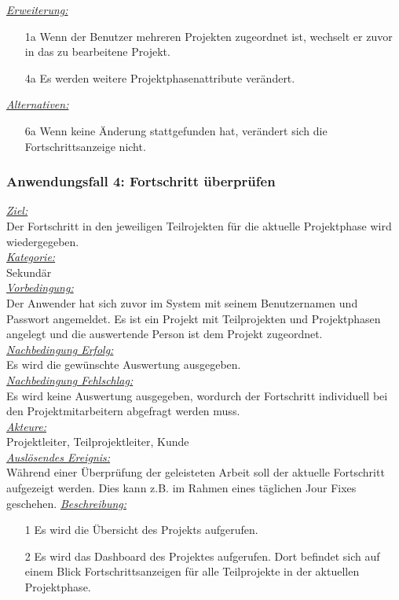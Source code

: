 \underline{\emph{Erweiterung:}} 
\begin{itemize}
    \item [1a] Wenn der Benutzer mehreren Projekten zugeordnet ist, wechselt er zuvor in das zu bearbeitene Projekt. 
    \item [4a] Es werden weitere Projektphasenattribute verändert.
\end{itemize}
\underline{\emph{Alternativen:}}
\begin{itemize}
    \item [6a] Wenn keine Änderung stattgefunden hat, verändert sich die Fortschrittsanzeige nicht.
\end{itemize}

\subsubsection{Anwendungsfall 4: Fortschritt überprüfen}
\underline{\emph{Ziel:}}\\
Der Fortschritt in den jeweiligen Teilrojekten für die aktuelle Projektphase wird wiedergegeben.\\
\underline{\emph{Kategorie:}} \\
Sekundär\\
\underline{\emph{Vorbedingung:}} \\
Der Anwender hat sich zuvor im System mit seinem Benutzernamen und Passwort angemeldet. Es ist ein Projekt mit Teilprojekten und Projektphasen angelegt und die auswertende Person ist dem Projekt zugeordnet.\\
\underline{\emph{Nachbedingung Erfolg:}} \\
Es wird die gewünschte Auswertung ausgegeben.\\
\underline{\emph{Nachbedingung Fehlschlag:}} \\
Es wird keine Auswertung ausgegeben, wordurch der Fortschritt individuell bei den Projektmitarbeitern abgefragt werden muss.\\
\underline{\emph{Akteure:}} \\
Projektleiter, Teilprojektleiter, Kunde\\
\underline{\emph{Auslösendes Ereignis:}} \\
Während einer Überprüfung der geleisteten Arbeit soll der aktuelle Fortschritt aufgezeigt werden. Dies kann z.B. im Rahmen eines täglichen Jour Fixes geschehen.
\underline{\emph{Beschreibung:}} 
\begin{itemize}
    \item [1] Es wird die Übersicht des Projekts aufgerufen.
    \item [2] Es wird das Dashboard des Projektes aufgerufen. Dort befindet sich auf einem Blick Fortschrittsanzeigen für alle Teilprojekte in der aktuellen Projektphase.
\end{itemize}
